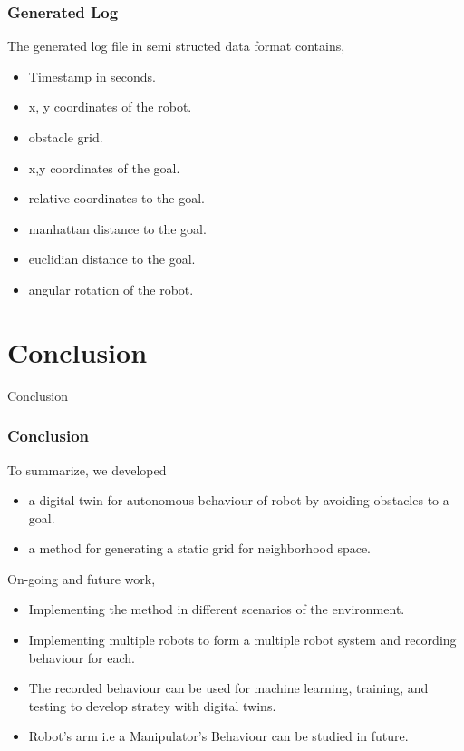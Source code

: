 \documentclass{beamer}
\begin{document}
\begin{frame}
    \frametitle{Generated Log}
    The generated log file in semi structed data format contains,
    \begin{itemize}
        \item Timestamp in seconds.
        \item x, y coordinates of the robot.
        \item obstacle grid.
        \item x,y coordinates of the goal.
        \item relative coordinates to the goal.
        \item manhattan distance to the goal.
        \item euclidian distance to the goal.
        \item angular rotation of the robot.
    \end{itemize}
\end{frame}

\section{Conclusion}

\begin{frame}
    \Huge{\centerline{Conclusion}}
\end{frame}

\begin{frame}
    \frametitle{Conclusion}
    To summarize, we developed
    \begin{itemize} 
        \item a digital twin for autonomous behaviour of robot by avoiding obstacles to a goal.
        \item a method for generating a static grid for neighborhood space.
    \end{itemize}
    On-going and future work,
    \begin{itemize}
        \item Implementing the method in different scenarios of the environment.
        \item Implementing multiple robots to form a multiple robot system and recording behaviour for each.
        \item The recorded behaviour can be used for machine learning, training, and testing to develop stratey with digital twins.
        \item Robot's arm i.e a Manipulator's Behaviour can be studied in future.
    \end{itemize}
\end{frame}
\end{document}
